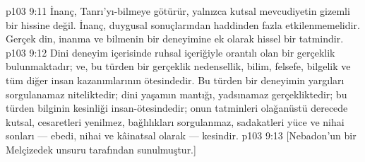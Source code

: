 \vs p103 9:11 İnanç, Tanrı’yı\hyp{}bilmeye götürür, yalnızca kutsal mevcudiyetin gizemli bir hissine değil. İnanç, duygusal sonuçlarından haddinden fazla etkilenmemelidir. Gerçek din, inanma ve bilmenin bir deneyimine ek olarak hissel bir tatmindir.
\vs p103 9:12 Dini deneyim içerisinde ruhsal içeriğiyle orantılı olan bir gerçeklik bulunmaktadır; ve, bu türden bir gerçeklik nedensellik, bilim, felsefe, bilgelik ve tüm diğer insan kazanımlarının ötesindedir. Bu türden bir deneyimin yargıları sorgulanamaz niteliktedir; dini yaşamın mantığı, yadsınamaz gerçekliktedir; bu türden bilginin kesinliği insan\hyp{}ötesindedir; onun tatminleri olağanüstü derecede kutsal, cesaretleri yenilmez, bağlılıkları sorgulanmaz, sadakatleri yüce ve nihai sonları --- ebedi, nihai ve kâinatsal olarak --- kesindir.
\vs p103 9:13 [Nebadon’un bir Melçizedek unsuru tarafından sunulmuştur.]
